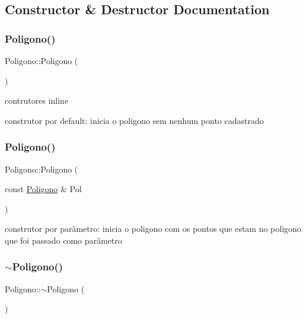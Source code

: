 \subsection{Constructor \& Destructor Documentation}
\mbox{\label{classPoligono_a9311a9a1496878c09c8508b3636e2870}} 
\subsubsection{\texorpdfstring{Poligono()}{Poligono()}\hspace{0.1cm}{\footnotesize\ttfamily [1/2]}}
{\footnotesize\ttfamily Poligono\+::\+Poligono (\begin{DoxyParamCaption}{ }\end{DoxyParamCaption})\hspace{0.3cm}{\ttfamily [inline]}}



contrutores inline 

construtor por default\+: inicia o poligono sem nenhum ponto cadastrado \mbox{\label{classPoligono_a7d2e73767b8dc1bce595f0f286d0e85a}} 
\subsubsection{\texorpdfstring{Poligono()}{Poligono()}\hspace{0.1cm}{\footnotesize\ttfamily [2/2]}}
{\footnotesize\ttfamily Poligono\+::\+Poligono (\begin{DoxyParamCaption}\item[{const \hyperlink{classPoligono}{Poligono} \&}]{Pol }\end{DoxyParamCaption})\hspace{0.3cm}{\ttfamily [inline]}}

construtor por parâmetro\+: inicia o poligono com os pontos que estam no poligono que foi passado como parâmetro \mbox{\label{classPoligono_a4dd7136ee506cb4355cbdc724c55a4a0}} 
\subsubsection{\texorpdfstring{$\sim$\+Poligono()}{~Poligono()}}
{\footnotesize\ttfamily Poligono\+::$\sim$\+Poligono (\begin{DoxyParamCaption}{ }\end{DoxyParamCaption})\hspace{0.3cm}{\ttfamily [inline]}}

